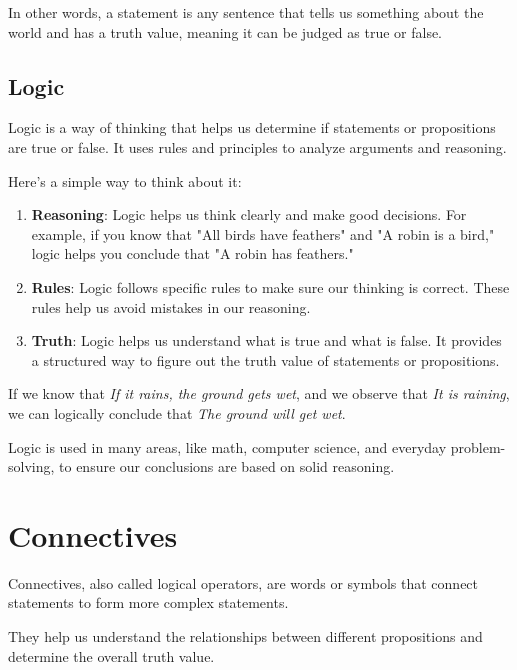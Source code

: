 \documentclass{article}
\theoremstyle{mytheoremstyle}
\theoremstyle{mytheoremstyle}
\theoremstyle{myexamplestyle}
\begin{document}
In other words, a statement is any sentence that tells us something about the world and has a truth value, meaning it can be judged as true or false.


\newpage

\subsection{Logic}

\begin{definition}
    Logic is a way of thinking that helps us determine if statements or propositions are true or false. It uses rules and principles to analyze arguments and reasoning.
\end{definition}

Here's a simple way to think about it:

\begin{enumerate}
    \item \textbf{Reasoning}: Logic helps us think clearly and make good decisions. For example, if you know that "All birds have feathers" and "A robin is a bird," logic helps you conclude that "A robin has feathers."

    \item \textbf{Rules}: Logic follows specific rules to make sure our thinking is correct. These rules help us avoid mistakes in our reasoning.

    \item \textbf{Truth}: Logic helps us understand what is true and what is false. It provides a structured way to figure out the truth value of statements or propositions.
\end{enumerate}


\begin{example}
    If we know that \emph{If it rains, the ground gets wet}, and we
    observe that \emph{It is raining}, we can logically conclude
    that \emph{The ground will get wet}.
\end{example}

Logic is used in many areas, like math, computer science, and everyday problem-solving, to ensure our conclusions are based on solid reasoning.

\section{Connectives}

\begin{definition}
    Connectives, also called logical operators, are words or symbols
    that connect statements to form more complex statements.
\end{definition}
They help us understand the relationships between different propositions and determine the overall truth value.
\end{document}
